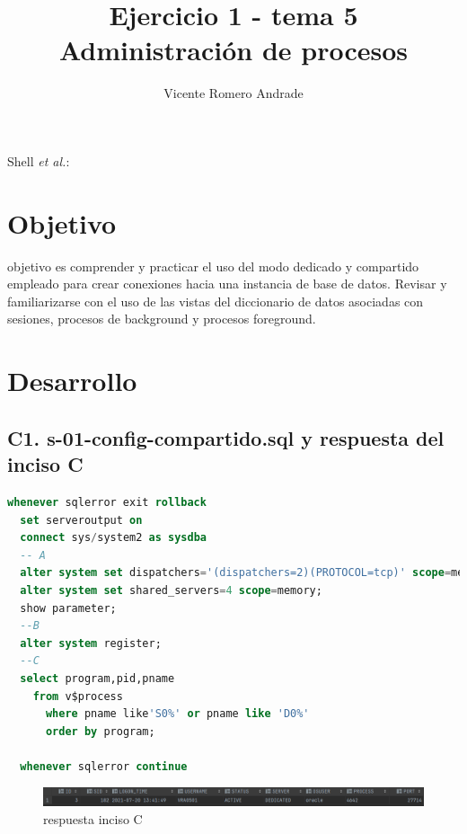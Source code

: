 \documentclass[journal]{IEEEtran}
\begin{document}
\title{Ejercicio 1 - tema 5 \\ Administración de procesos}
%
\author{Vicente Romero Andrade}

%
{Shell \MakeLowercase{\textit{et al.}}: }

\maketitle


\IEEEpeerreviewmaketitle

\section{Objetivo}

 objetivo es comprender y practicar el uso del modo dedicado y  
compartido empleado para crear conexiones hacia una instancia de base de datos.    
Revisar y familiarizarse con el uso de las vistas del diccionario de datos asociadas con sesiones, 
procesos de background y procesos foreground.

\section{Desarrollo}
\subsection{C1. s-01-config-compartido.sql y respuesta del inciso C}
\begin{lstlisting}[language=sql, caption=s-01-config-compartido.sql,label={lst:codigo1}]
  whenever sqlerror exit rollback
  set serveroutput on
  connect sys/system2 as sysdba
  -- A
  alter system set dispatchers='(dispatchers=2)(PROTOCOL=tcp)' scope=memory;
  alter system set shared_servers=4 scope=memory;
  show parameter;
  --B
  alter system register;
  --C
  select program,pid,pname 
    from v$process 
      where pname like'S0%' or pname like 'D0%' 
      order by program;
      
  whenever sqlerror continue  
\end{lstlisting}
\begin{figure}[H]
  \centering
  \includegraphics[scale=.22]{captura_1.png}
   \caption{respuesta inciso C}
   \label{fig:validador_1}
\end{figure}
\end{document}
